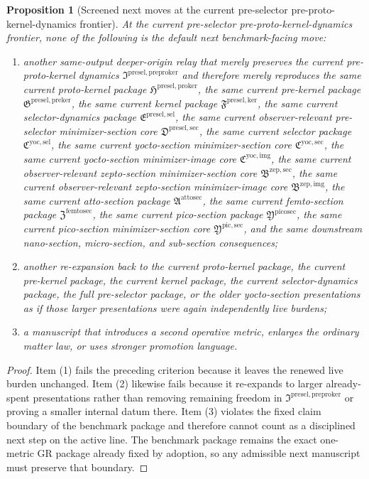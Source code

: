 \documentclass[11pt]{article}
\newcommand{\PreProtoKernelPackage}{\mathfrak I^{\mathrm{presel,preproker}}}
\newcommand{\ProtoKernelPackage}{\mathfrak H^{\mathrm{presel,proker}}}
\newcommand{\PreKernelPackage}{\mathfrak G^{\mathrm{presel,preker}}}
\newcommand{\KernelPackage}{\mathfrak F^{\mathrm{presel,ker}}}
\newcommand{\PreSectionSelectorPackage}{\mathfrak E^{\mathrm{presel,sel}}}
\newcommand{\PreSelectorMinSectionCore}{\mathfrak D^{\mathrm{presel,sec}}}
\newcommand{\YoctoSelectorPackage}{\mathfrak C^{\mathrm{yoc,sel}}}
\newcommand{\YoctoImageCore}{\mathfrak C^{\mathrm{yoc,img}}}
\newcommand{\YoctoMinSectionCore}{\mathfrak C^{\mathrm{yoc,sec}}}
\newcommand{\ZeptoImageCore}{\mathfrak B^{\mathrm{zep,img}}}
\newcommand{\ZeptoMinSectionCore}{\mathfrak B^{\mathrm{zep,sec}}}
\newcommand{\AttoSectionPackage}{\mathfrak A^{\mathrm{attosec}}}
\newcommand{\FemtoSectionPackage}{\mathfrak Z^{\mathrm{femtosec}}}
\newcommand{\PicoSectionPackage}{\mathfrak Y^{\mathrm{picosec}}}
\newcommand{\PicoMinSectionCore}{\mathfrak Y^{\mathrm{pic,sec}}}
\newtheorem{proposition}{Proposition}
\begin{document}
\begin{proposition}[Screened next moves at the current pre-selector pre-proto-kernel-dynamics frontier]
At the current pre-selector pre-proto-kernel-dynamics frontier, none of the following is the default next benchmark-facing move:
\begin{enumerate}
    \item another same-output deeper-origin relay that merely preserves the current pre-proto-kernel dynamics \(\PreProtoKernelPackage\) and therefore merely reproduces the same current proto-kernel package \(\ProtoKernelPackage\), the same current pre-kernel package \(\PreKernelPackage\), the same current kernel package \(\KernelPackage\), the same current selector-dynamics package \(\PreSectionSelectorPackage\), the same current observer-relevant pre-selector minimizer-section core \(\PreSelectorMinSectionCore\), the same current selector package \(\YoctoSelectorPackage\), the same current yocto-section minimizer-section core \(\YoctoMinSectionCore\), the same current yocto-section minimizer-image core \(\YoctoImageCore\), the same current observer-relevant zepto-section minimizer-section core \(\ZeptoMinSectionCore\), the same current observer-relevant zepto-section minimizer-image core \(\ZeptoImageCore\), the same current atto-section package \(\AttoSectionPackage\), the same current femto-section package \(\FemtoSectionPackage\), the same current pico-section package \(\PicoSectionPackage\), the same current pico-section minimizer-section core \(\PicoMinSectionCore\), and the same downstream nano-section, micro-section, and sub-section consequences;
    \item another re-expansion back to the current proto-kernel package, the current pre-kernel package, the current kernel package, the current selector-dynamics package, the full pre-selector package, or the older yocto-section presentations as if those larger presentations were again independently live burdens;
    \item a manuscript that introduces a second operative metric, enlarges the ordinary matter law, or uses stronger promotion language.
\end{enumerate}
\end{proposition}

\begin{proof}
Item (1) fails the preceding criterion because it leaves the renewed live burden unchanged. Item (2) likewise fails because it re-expands to larger already-spent presentations rather than removing remaining freedom in \(\PreProtoKernelPackage\) or proving a smaller internal datum there. Item (3) violates the fixed claim boundary of the benchmark package and therefore cannot count as a disciplined next step on the active line. The benchmark package remains the exact one-metric GR package already fixed by adoption, so any admissible next manuscript must preserve that boundary.
\end{proof}
\end{document}
